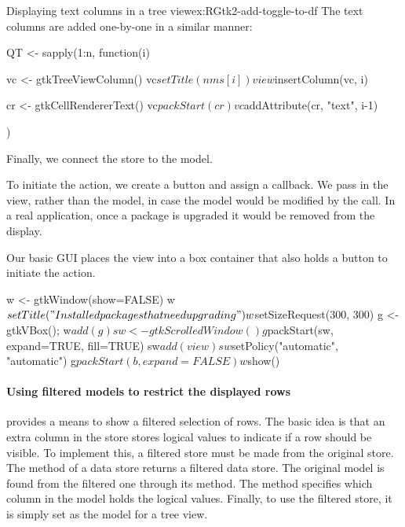 \begin{example}{Displaying text columns in a tree view}{ex:RGtk2-add-toggle-to-df}
The text columns are added one-by-one in a similar manner:
\begin{Schunk}
\begin{Sinput}
 QT <- sapply(1:n, function(i) {
   vc <- gtkTreeViewColumn()
   vc$setTitle(nms[i])
   view$insertColumn(vc, i)
 
   cr <- gtkCellRendererText()
   vc$packStart(cr)
   vc$addAttribute(cr, "text", i-1)
 })
\end{Sinput}
\end{Schunk}

Finally, we connect the store to the model.
\begin{Schunk}
\end{Schunk}

To initiate the action, we create a button and assign a callback. We
pass in the view, rather than the model, in case the model would be
modified by the  call. In a real application, once a
package is upgraded it would be removed from the display.
\begin{Schunk}
\end{Schunk}


Our basic GUI places the view into a box container that also holds a
button to initiate the action.
\begin{Schunk}
\begin{Sinput}
 w <- gtkWindow(show=FALSE)
 w$setTitle("Installed packages that need upgrading")
 w$setSizeRequest(300, 300)
 g <- gtkVBox(); w$add(g)
 sw <- gtkScrolledWindow()
 g$packStart(sw, expand=TRUE, fill=TRUE)
 sw$add(view)
 sw$setPolicy("automatic", "automatic")
 g$packStart(b, expand=FALSE)
 w$show()
\end{Sinput}
\end{Schunk}
\end{example}

\paragraph{Using filtered models to restrict the displayed rows}
\GTK\/ provides a means to show a filtered selection of rows. The
basic idea is that an extra column in the store stores logical values
to indicate if a row should be visible. To implement this, a filtered
store must be made from the original store. The
 method of a data store returns a
filtered data store. The original model is found from the filtered one
through its  method. The method
 specifies which column
in the model holds the logical values.  Finally, to use the filtered store, it is simply set as
the model for a tree view.

